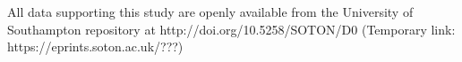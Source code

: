 \documentclass[runningheads,a4paper]{llncs}
\begin{document}
\vspace{-1 pt}

\begin{scriptsize}
	
	\par
	\noindent
	All data supporting this study are openly available from the University of Southampton repository at
	http://doi.org/10.5258/SOTON/D0 (Temporary link: https://eprints.soton.ac.uk/???)\\
	
	
\end{scriptsize}




\end{document}
